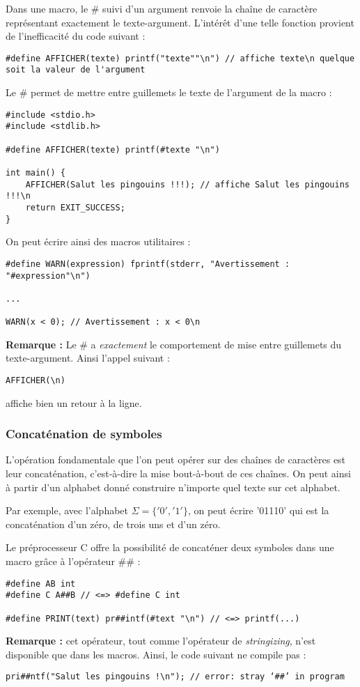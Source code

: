 \documentclass[../../../main.tex]{subfiles}
\begin{document}
Dans une macro, le \# suivi d'un argument renvoie la chaîne de caractère représentant exactement le texte-argument. L'intérêt d'une telle fonction provient de l'inefficacité du code suivant :
\begin{verbatim}
#define AFFICHER(texte) printf("texte""\n") // affiche texte\n quelque soit la valeur de l'argument
\end{verbatim}
Le \# permet de mettre entre guillemets le texte de l'argument de la macro :
\begin{verbatim}
#include <stdio.h>
#include <stdlib.h>

#define AFFICHER(texte) printf(#texte "\n")

int main() {
	AFFICHER(Salut les pingouins !!!); // affiche Salut les pingouins !!!\n
	return EXIT_SUCCESS;
}
\end{verbatim}
On peut écrire ainsi des macros utilitaires :
\begin{verbatim}
#define WARN(expression) fprintf(stderr, "Avertissement : "#expression"\n")

...

WARN(x < 0); // Avertissement : x < 0\n
\end{verbatim}
\textbf{Remarque :} Le \# a \textit{exactement} le comportement de mise entre guillemets du texte-argument. Ainsi l'appel suivant :
\begin{verbatim}
AFFICHER(\n)
\end{verbatim}
affiche bien un retour à la ligne.
\subsubsection{Concaténation de symboles}
L'opération fondamentale que l'on peut opérer sur des chaînes de caractères est leur concaténation, c'est-à-dire la mise bout-à-bout de ces chaînes. On peut ainsi à partir d'un alphabet donné construire n'importe quel texte sur cet alphabet.

Par exemple, avec l'alphabet $\Sigma = \{'0', '1'\}$, on peut écrire '01110' qui est la concaténation d'un zéro, de trois uns et d'un zéro.

Le préprocesseur C offre la possibilité de concaténer deux symboles dans une macro grâce à l'opérateur \#\# :
\begin{verbatim}
#define AB int
#define C A##B // <=> #define C int

#define PRINT(text) pr##intf(#text "\n") // <=> printf(...)
\end{verbatim}
\textbf{Remarque :} cet opérateur, tout comme l'opérateur de \textit{stringizing}, n'est disponible que dans les macros. Ainsi, le code suivant ne compile pas :
\begin{verbatim}
pri##ntf("Salut les pingouins !\n"); // error: stray ‘##’ in program 
\end{verbatim}
\end{document}
